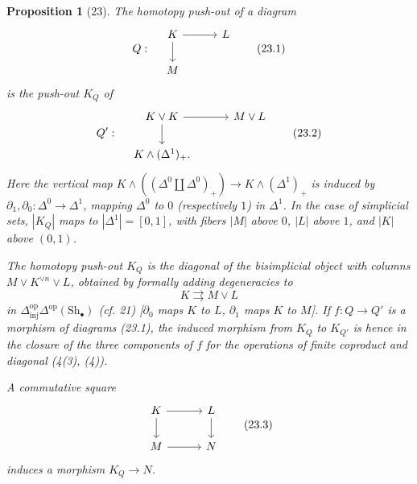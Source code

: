 \documentclass[11pt]{article}
\newcommand{\Sh}{\mathrm{Sh}}
\theoremstyle{deligne}
\newtheorem*{proposition*}{Proposition}
\newcommand{\inj}{\mathrm{inj}}
\newcommand{\op}{\mathrm{op}}
\begin{document}
\begin{proposition*}[23]
The homotopy push-out of a diagram
\[
Q:\quad
\begin{tikzcd}[column sep=3.0em,row sep=1.8em]
K \arrow[r] \arrow[d] & L \\
M
\end{tikzcd}
\tag{23.1}
\]
is the push-out \(K_Q\) of
\[
Q':\quad
\begin{tikzcd}[column sep=3.0em,row sep=1.8em]
K\vee K \arrow[r] \arrow[d] & M\vee L \\
K\wedge(\Delta^1)_+ .
\end{tikzcd}
\tag{23.2}
\]
Here the vertical map \(K\wedge((\Delta^0\coprod\Delta^0)_+)\to K\wedge(\Delta^1)_+\) is induced by \(\partial_1,\partial_0:\Delta^0\to\Delta^1\), mapping \(\Delta^0\) to \(0\) (respectively \(1\)) in \(\Delta^1\). In the case of simplicial sets, \(|K_Q|\) maps to \(|\Delta^1|=[0,1]\), with fibers \(|M|\) above \(0\), \(|L|\) above \(1\), and \(|K|\) above \((0,1)\).

The homotopy push-out \(K_Q\) is the diagonal of the bisimplicial object with columns \(M\vee K^{\vee n}\vee L\), obtained by formally adding degeneracies to
\[
K\rightrightarrows M\vee L
\]
in \(\Delta^{\op}_{\inj}\Delta^{\op}(\Sh_\bullet)\) (cf. 21) [\(\partial_0\) maps \(K\) to \(L\), \(\partial_1\) maps \(K\) to \(M\)]. If \(f:Q\to Q'\) is a morphism of diagrams (23.1), the induced morphism from \(K_Q\) to \(K_{Q'}\) is hence in the closure of the three components of \(f\) for the operations of finite coproduct and diagonal (4(3), (4)).

A commutative square
\[
\begin{tikzcd}[column sep=3.0em,row sep=1.8em]
K \arrow[r] \arrow[d] & L \arrow[d] \\
M \arrow[r] & N
\end{tikzcd}
\tag{23.3}
\]
induces a morphism \(K_Q\to N\).
\end{proposition*}
\end{document}
